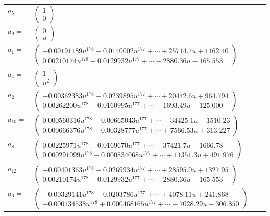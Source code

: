 \documentclass[1p]{elsarticle_modified}
\theoremstyle{definition}
\begin{document}
\begin{tabular}{m{7pt} m{180pt} m{7pt} m{180pt} }
\flushright $a_{5}=$&$\begin{pmatrix}1\\0\end{pmatrix}$ \\
\flushright $a_{9}=$&$\begin{pmatrix}0\\u\end{pmatrix}$ \\
\flushright $a_{1}=$&$\begin{pmatrix}-0.00191189 u^{178}+0.0140002 u^{177}+\cdots+25714.7 u+1162.40\\0.00210174 u^{178}-0.0129932 u^{177}+\cdots-2880.36 u-165.553\end{pmatrix}$ \\
\flushright $a_{4}=$&$\begin{pmatrix}1\\u^2\end{pmatrix}$ \\
\flushright $a_{2}=$&$\begin{pmatrix}-0.00362383 u^{178}+0.0239895 u^{177}+\cdots+20442.6 u+964.794\\0.00262200 u^{178}-0.0160995 u^{177}+\cdots-1693.49 u-125.000\end{pmatrix}$ \\
\flushright $a_{10}=$&$\begin{pmatrix}0.000560316 u^{178}-0.00665043 u^{177}+\cdots-34425.1 u-1510.23\\0.000666376 u^{178}-0.00328777 u^{177}+\cdots+7566.53 u+313.227\end{pmatrix}$ \\
\flushright $a_{8}=$&$\begin{pmatrix}0.00225971 u^{178}-0.0169670 u^{177}+\cdots-37421.7 u-1666.78\\0.000291099 u^{178}-0.000834068 u^{177}+\cdots+11351.3 u+491.976\end{pmatrix}$ \\
\flushright $a_{12}=$&$\begin{pmatrix}-0.00401363 u^{178}+0.0269934 u^{177}+\cdots+28595.0 u+1327.95\\0.00210174 u^{178}-0.0129932 u^{177}+\cdots-2880.36 u-165.553\end{pmatrix}$ \\
\flushright $a_{6}=$&$\begin{pmatrix}-0.00329141 u^{178}+0.0203786 u^{177}+\cdots+4078.11 u+241.868\\-0.000134538 u^{178}+0.000468165 u^{177}+\cdots-7028.29 u-306.850\end{pmatrix}$ \\

\end{tabular}
\end{document}
